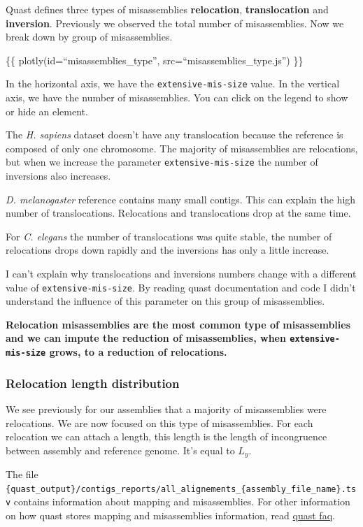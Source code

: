 \documentclass[./main.tex]{subfiles}
\begin{document}
Quast defines three types of misassemblies \textbf{relocation},
\textbf{translocation} and \textbf{inversion}. Previously we observed
the total number of misassemblies. Now we break down by group of
misassemblies.

\{\{ plotly(id=``misassemblies\_type'', src=``misassemblies\_type.js'')
\}\}

In the horizontal axis, we have the \texttt{extensive-mis-size} value.
In the vertical axis, we have the number of misassemblies. You can click
on the legend to show or hide an element.

The \emph{H. sapiens} dataset doesn't have any translocation because the
reference is composed of only one chromosome. The majority of
misassemblies are relocations, but when we increase the parameter
\texttt{extensive-mis-size} the number of inversions also increases.

\emph{D. melanogaster} reference contains many small contigs. This can
explain the high number of translocations. Relocations and
translocations drop at the same time.

For \emph{C. elegans} the number of translocations was quite stable, the
number of relocations drops down rapidly and the inversions has only a
little increase.

I can't explain why translocations and inversions numbers change with a
different value of \texttt{extensive-mis-size}. By reading quast
documentation and code I didn't understand the influence of this
parameter on this group of misassemblies.

\textbf{Relocation misassemblies are the most common type of
misassemblies and we can impute the reduction of misassemblies, when
\texttt{extensive-mis-size} grows, to a reduction of relocations.}

\subsubsection{Relocation length
distribution}\label{relocation-length-distribution}

We see previously for our assemblies that a majority of misassemblies
were relocations. We are now focused on this type of misassemblies. For
each relocation we can attach a length, this length is the length of
incongruence between assembly and reference genome. It's equal to
\(L_y\).

The file
\texttt{\{quast\_output\}/contigs\_reports/all\_alignements\_\{assembly\_file\_name\}.tsv}
contains information about mapping and misassemblies. For other
information on how quast stores mapping and misassemblies information,
read \href{http://quast.bioinf.spbau.ru/manual.html\#sec7}{quast faq}.
\end{document}
